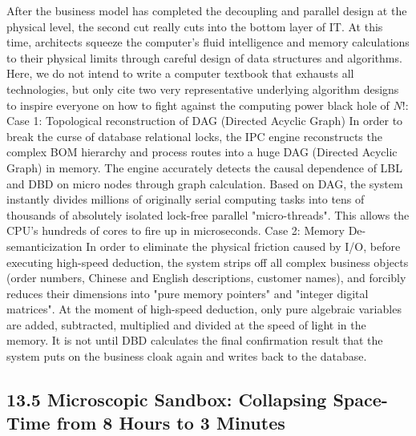 \documentclass[11pt,a4paper]{article}
\begin{document}
After the business model has completed the decoupling and parallel design at the physical level, the second cut really cuts into the bottom layer of IT. At this time, architects squeeze the computer's fluid intelligence and memory calculations to their physical limits through careful design of data structures and algorithms. Here, we do not intend to write a computer textbook that exhausts all technologies, but only cite two very representative underlying algorithm designs to inspire everyone on how to fight against the computing power black hole of $N!$: Case 1: Topological reconstruction of DAG (Directed Acyclic Graph) In order to break the curse of database relational locks, the IPC engine reconstructs the complex BOM hierarchy and process routes into a huge DAG (Directed Acyclic Graph) in memory. The engine accurately detects the causal dependence of LBL and DBD on micro nodes through graph calculation. Based on DAG, the system instantly divides millions of originally serial computing tasks into tens of thousands of absolutely isolated lock-free parallel "micro-threads". This allows the CPU's hundreds of cores to fire up in microseconds. Case 2: Memory De-semanticization In order to eliminate the physical friction caused by I/O, before executing high-speed deduction, the system strips off all complex business objects (order numbers, Chinese and English descriptions, customer names), and forcibly reduces their dimensions into "pure memory pointers" and "integer digital matrices". At the moment of high-speed deduction, only pure algebraic variables are added, subtracted, multiplied and divided at the speed of light in the memory. It is not until DBD calculates the final confirmation result that the system puts on the business cloak again and writes back to the database.


\subsection*{13.5 Microscopic Sandbox: Collapsing Space-Time from 8 Hours to 3 Minutes}
\end{document}
